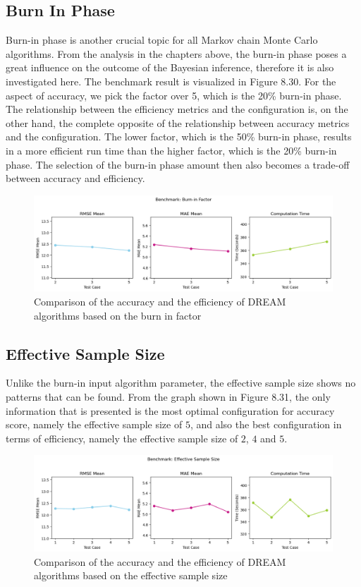 \subsection{Burn In Phase}
Burn-in phase is another crucial topic for all Markov chain Monte Carlo algorithms. From the analysis in the chapters above, the burn-in phase poses a great influence on the outcome of the Bayesian inference, therefore it is also investigated here. The benchmark result is visualized in Figure 8.30. For the aspect of accuracy, we pick the factor over 5, which is the 20\% burn-in phase. The relationship between the efficiency metrics and the configuration is, on the other hand, the complete opposite of the relationship between accuracy metrics and the configuration. The lower factor, which is the 50\% burn-in phase, results in a more efficient run time than the higher factor, which is the 20\% burn-in phase. The selection of the burn-in phase amount then also becomes a trade-off between accuracy and efficiency.
\begin{figure}[H]
    \centering
    \includegraphics[width=1\textwidth]{figures/dream/burn_in.png}
    \captionsetup{width=.8\textwidth}
    \caption{Comparison of the accuracy and the efficiency of DREAM algorithms based on the burn in factor}
    \label{fig:enter-label}
\end{figure}

\subsection{Effective Sample Size}
Unlike the burn-in input algorithm parameter, the effective sample size shows no patterns that can be found. From the graph shown in Figure 8.31, the only information that is presented is the most optimal configuration for accuracy score, namely the effective sample size of $5$, and also the best configuration in terms of efficiency, namely the effective sample size of $2$, $4$ and $5$.
\begin{figure}[H]
    \centering
    \includegraphics[width=1\textwidth]{figures/dream/ess.png}
    \captionsetup{width=.8\textwidth}
    \caption{Comparison of the accuracy and the efficiency of DREAM algorithms based on the effective sample size}
    \label{fig:enter-label}
\end{figure}